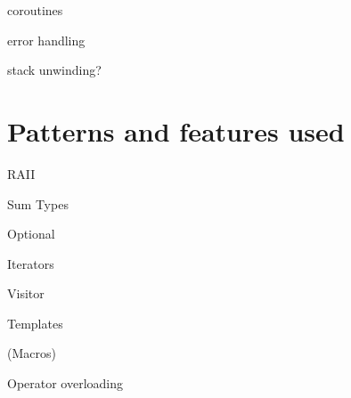             coroutines %
            
            error handling
            
            stack unwinding?
    
    \section{Patterns and features used}
    
        RAII
        
        Sum Types
        
        Optional
        
        Iterators
        
        Visitor
        
        Templates
        
        (Macros)
        
        Operator overloading
